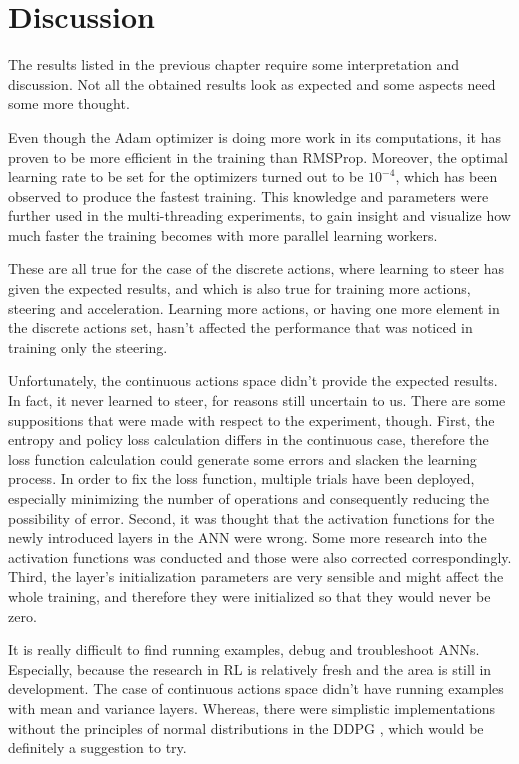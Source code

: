 \chapter{Discussion}\label{Discussion}
The results listed in the previous chapter require some interpretation and discussion. Not all the obtained results look as expected and some aspects need some more thought.

Even though the Adam optimizer is doing more work in its computations, it has proven to be more efficient in the training than RMSProp. Moreover, the optimal learning rate to be set for the optimizers turned out to be $10^{-4}$, which has been observed to produce the fastest training. This knowledge and parameters were further used in the multi-threading experiments, to gain insight and visualize how much faster the training becomes with more parallel learning workers.

These are all true for the case of the discrete actions, where learning to steer has given the expected results, and which is also true for training more actions, steering and acceleration. Learning more actions, or having one more element in the discrete actions set, hasn't affected the performance that was noticed in training only the steering.

Unfortunately, the continuous actions space didn't provide the expected results. In fact, it never learned to steer, for reasons still uncertain to us. There are some suppositions that were made with respect to the experiment, though. First, the entropy and policy loss calculation differs in the continuous case, therefore the loss function calculation could generate some errors and slacken the learning process. In order to fix the loss function, multiple trials have been deployed, especially minimizing the number of operations and consequently reducing the possibility of error. Second, it was thought that the activation functions for the newly introduced layers in the ANN were wrong. Some more research into the activation functions was conducted and those were also corrected correspondingly. Third, the layer's initialization parameters are very sensible and might affect the whole training, and therefore they were initialized so that they would never be zero. 

It is really difficult to find running examples, debug and troubleshoot ANNs. Especially, because the research in RL is relatively fresh and the area is still in development. The case of continuous actions space didn't have running examples with mean and variance layers. Whereas, there were simplistic implementations without the principles of normal distributions in the DDPG \cite{DDPG_Torcs}, which would be definitely a suggestion to try.

